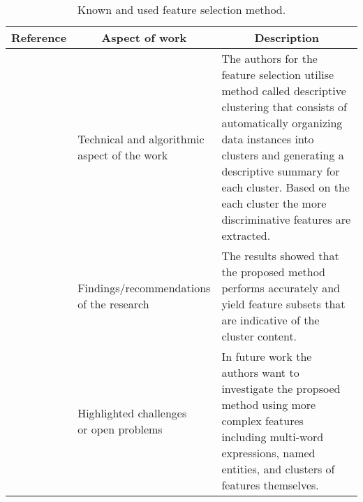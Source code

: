 \begin{landscape}
    \begin{longtable}{lp{}p{}}
    \caption{Known and used feature selection method.} \\
    \hline    
    Reference & \multicolumn{1}{c}{Aspect of work} & \multicolumn{1}{c}{Description} \\
	\hline
	
	\multirow{3}[0]{*}{~\citep{Brockmeier2018}} & 
    \specialcell{Technical and algorithmic \\ aspect of the work} &
    The authors for the feature selection utilise method called descriptive clustering that consists of automatically organizing data instances into clusters and generating a descriptive summary for each cluster. Based on the each cluster the more discriminative features are extracted.    
    \\ & 
    \specialcell{Findings/recommendations \\ of the research} & 
    The results showed that the proposed method performs accurately and yield feature subsets that are indicative of the cluster content. 
    \\ & 
    \specialcell{Highlighted challenges \\ or open problems} & 
    In future work the authors want to investigate the propsoed method using more complex features including multi-word expressions, named entities, and clusters of features themselves.
    \\
	

\end{longtable}
\end{landscape}
